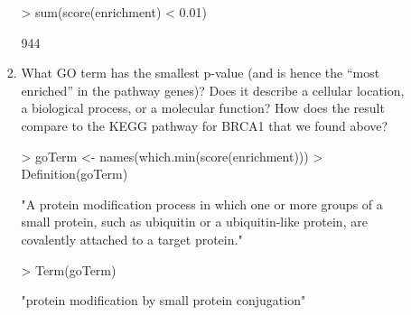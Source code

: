 \documentclass[12pt,a4paper]{paper}
\begin{document}
\begin{enumerate}
\begin{enumerate}
\begin{enumerate}
\begin{Schunk}
\begin{Sinput}
> sum(score(enrichment) < 0.01)
\end{Sinput}
\begin{Soutput}
[1] 944
\end{Soutput}
\end{Schunk}
\item What GO term has the smallest p-value (and is hence the “most enriched” in the
pathway genes)? Does it describe a cellular location, a biological process, or a
molecular function? How does the result compare to the KEGG pathway for BRCA1
that we found above?
\begin{Schunk}
\begin{Sinput}
> goTerm <- names(which.min(score(enrichment)))
> Definition(goTerm)
\end{Sinput}
\begin{Soutput}                                                                                                                                                                
"A protein modification process in which one or more groups of a small 
 protein, such as ubiquitin or a ubiquitin-like protein, are covalently 
 attached to a target protein." 
\end{Soutput}
\begin{Sinput}
> Term(goTerm)
\end{Sinput}
\begin{Soutput}
"protein modification by small protein conjugation" 
\end{Soutput}
\end{Schunk}
\end{enumerate}
\end{enumerate}
\end{enumerate}
\end{document}

